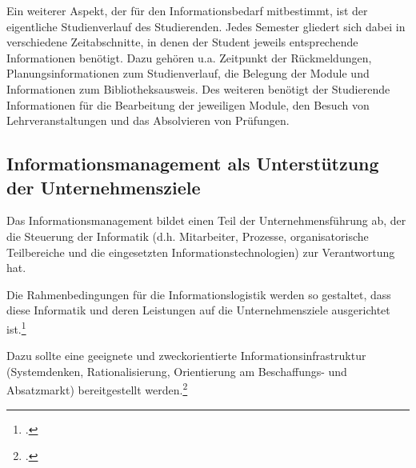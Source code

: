 Ein weiterer Aspekt, der für den Informationsbedarf mitbestimmt, ist der eigentliche Studienverlauf des Studierenden. Jedes Semester gliedert sich dabei in verschiedene Zeitabschnitte, in denen der Student jeweils entsprechende Informationen benötigt. Dazu gehören u.a. Zeitpunkt der Rückmeldungen, Planungsinformationen zum Studienverlauf, die Belegung der Module und Informationen zum Bibliotheksausweis. Des weiteren benötigt der Studierende Informationen für die Bearbeitung der jeweiligen Module, den Besuch von Lehrveranstaltungen und das Absolvieren von Prüfungen. 

\subsection{Informationsmanagement als Unterstützung der Unternehmensziele}
Das Informationsmanagement bildet einen Teil der Unternehmensführung ab, der die Steuerung der Informatik (d.h. Mitarbeiter, Prozesse, organisatorische Teilbereiche und die eingesetzten Informationstechnologien) zur Verantwortung hat.

Die Rahmenbedingungen für die Informationslogistik werden so gestaltet, dass diese Informatik und deren Leistungen auf die Unternehmensziele ausgerichtet ist.\footcite{voss_informationsmanagement_2001}

Dazu sollte eine geeignete und zweckorientierte Informationsinfrastruktur (Systemdenken, Rationalisierung, Orientierung am Beschaffungs- und Absatzmarkt) bereitgestellt werden.\footcite[Vgl. Vieweger, Bernd, zitiert nach:]{Bartels_ModulInformationsmanagement_2014}

